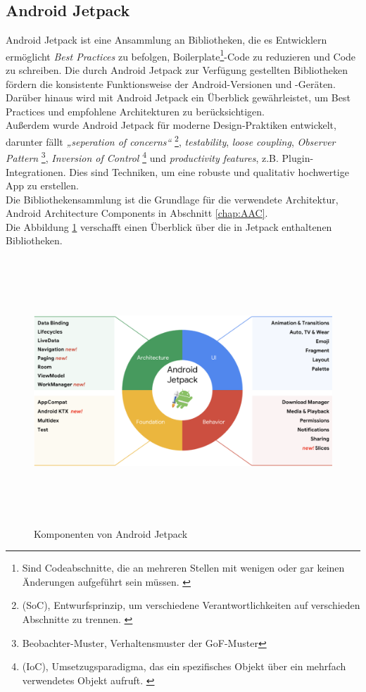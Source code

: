 \subsection{Android Jetpack}
\label{sec:androidjetpack}
Android Jetpack ist eine Ansammlung an Bibliotheken, die es Entwicklern ermöglicht \textit{Best Practices} zu befolgen, 
Boilerplate\footnote{Sind Codeabschnitte, die an mehreren Stellen mit wenigen oder gar keinen Änderungen aufgeführt sein müssen. \cite{boilerplate.2019m}}-Code 
zu reduzieren und Code zu schreiben. Die durch Android Jetpack zur Verfügung gestellten Bibliotheken fördern die konsistente Funktionsweise der 
Android-Versionen und -Geräten. Darüber hinaus wird mit Android Jetpack ein Überblick gewährleistet, um Best Practices und empfohlene 
Architekturen zu berücksichtigen.
\\ 
Außerdem wurde Android Jetpack für moderne Design-Praktiken entwickelt, darunter fällt \textit{„seperation of concerns“} 
\footnote{(SoC), Entwurfsprinzip, um verschiedene Verantwortlichkeiten auf verschieden Abschnitte zu trennen. \cite{soc.2019a}}, \textit{testability}, 
\textit{loose coupling}, \textit{Observer Pattern} \footnote{Beobachter-Muster, Verhaltensmuster der GoF-Muster}, 
\textit{Inversion of Control} 
\footnote{(IoC), Umsetzugsparadigma, das ein spezifisches Objekt über ein mehrfach verwendetes Objekt aufruft. \cite{ioc.2020}} und 
\textit{productivity features}, z.B. Plugin-Integrationen. Dies sind Techniken, um eine robuste und qualitativ hochwertige App zu erstellen.
\\ 
Die Bibliothekensammlung ist die Grundlage für die verwendete Architektur, Android Architecture Components in Abschnitt \ref{chap:AAC}.
\\ 
\linebreak
Die Abbildung \ref{pic:androidjetpackcomp} verschafft einen Überblick über die in Jetpack enthaltenen Bibliotheken. %
\begin{figure}[hbt!]
    \centering
    \includegraphics[width=15cm,height=10cm,keepaspectratio]{2Grundlagen/Bilder/androidjetpackcomps.png}
    \caption{Komponenten von Android Jetpack \cite{androidjpdescr.2018m}}
    \label{pic:androidjetpackcomp}
\end{figure}
